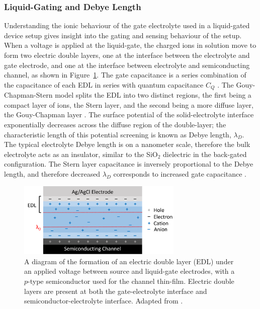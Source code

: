 \documentclass[
  a4paper,
]{scrbook}
\begin{document}
\hypertarget{liquid-gating-and-debye-length}{%
\subsubsection*{Liquid-Gating and Debye
Length}\label{liquid-gating-and-debye-length}}

Understanding the ionic behaviour of the gate electrolyte used in a
liquid-gated device setup gives insight into the gating and sensing
behaviour of the setup. When a voltage is applied at the liquid-gate,
the charged ions in solution move to form two electric double layers,
one at the interface between the electrolyte and gate electrode, and one
at the interface between electrolyte and semiconducting channel, as
shown in Figure~\ref{fig-Debye-length}. The gate capacitance is a series
combination of the capacitance of each EDL in series with quantum
capacitance \(C_{Q}\) \autocite{Heller2010,Kireev2017,Shkodra2021}. The
Gouy-Chapman-Stern model splits the EDL into two distinct regions, the
first being a compact layer of ions, the Stern layer, and the second
being a more diffuse layer, the Gouy-Chapman layer
\autocite{Tiwari2022}. The surface potential of the solid-electrolyte
interface exponentially decreases across the diffuse region of the
double-layer; the characteristic length of this potential screening is
known as Debye length, \(\lambda_D\). The typical electrolyte Debye
length is on a nanometer scale, therefore the bulk electrolyte acts as
an insulator, similar to the SiO\(_2\) dielectric in the back-gated
configuration. The Stern layer capacitance is inversely proportional to
the Debye length, and therefore decreased \(\lambda_D\) corresponds to
increased gate capacitance
\autocite{Heller2010,Ohno2015,Shkodra2021,Yao2021}.

\begin{figure}

{\centering \includegraphics[width=0.7\textwidth,height=\textheight]{figures/ch2/Debye-length-schematic-alt.png}

}

\caption[A diagram of an electric double layer between source and
liquid-gate electrodes.]{\label{fig-Debye-length}A diagram of the
formation of an electric double layer (EDL) under an applied voltage
between source and liquid-gate electrodes, with a \(p\)-type
semiconductor used for the channel thin-film. Electric double layers are
present at both the gate-electrolyte interface and
semiconductor-electrolyte interface. Adapted from
\autocite{Ohno2015,Shkodra2021,Tiwari2022}.}

\end{figure}
\end{document}
